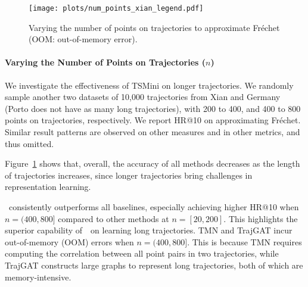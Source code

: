 \begin{figure}[ht]
 \vspace{-2mm}
    \hspace*{2mm}
    \texttt{[image: plots/num\_points\_xian\_legend.pdf]} \\
     \vspace{-5mm}
     
     \hspace*{-2mm}
     \hspace*{-2mm}
    \vspace{-2mm}
    \caption{Varying the number of points on trajectories to approximate Fr\'echet (OOM: out-of-memory error).}\label{fig:exp_num_points}
\end{figure}
\vspace{-3mm}



\paragraph{Varying the Number of Points on Trajectories ($n$)} 
We investigate the effectiveness of TSMini on longer trajectories.
We randomly sample another two datasets of 10,000 trajectories from Xian and Germany (Porto does not have as many long trajectories), with 200 to 400, and 400 to 800 points on trajectories, respectively.
We report HR@10 on approximating Fr\'echet. Similar result patterns are observed on other measures and in other metrics, and thus omitted.

Figure~\ref{fig:exp_num_points} shows that, overall, the accuracy of all methods decreases as the length of trajectories increases, since longer trajectories bring challenges in representation learning.

\model\ consistently outperforms all baselines, especially achieving higher HR@10 when $n=(400,800]$ compared to other methods at $n=[20,200]$. This highlights the superior capability of~\model\ on learning long trajectories. 
TMN and TrajGAT incur out-of-memory (OOM) errors when $n=(400,800]$. This is because TMN requires computing the correlation between all point pairs in two trajectories, while TrajGAT constructs large graphs to represent long trajectories, both of which are memory-intensive.

